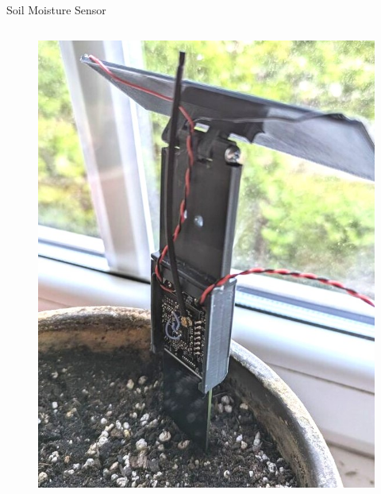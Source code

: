 \documentclass{beamer}
\begin{document}
\begin{frame}{Soil Moisture Sensor}
\begin{columns}[T]
\begin{column}{.5\textwidth}
\begin{figure}
        \includegraphics[width=\linewidth]{../thesis/img/sensor-deploy-close.jpg}
    \end{figure}
\end{column}
\end{columns}
\end{frame}
\end{document}
